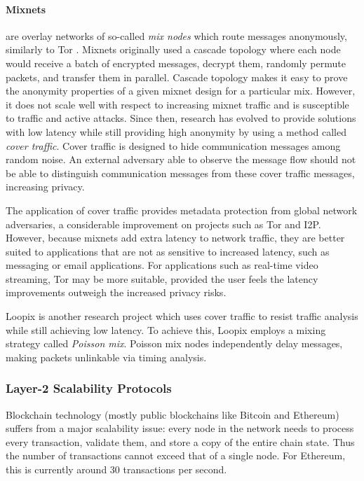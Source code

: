 \paragraph{Mixnets} are overlay networks of so-called \textit{mix nodes} which route messages anonymously, similarly to Tor \cite{mixnets}. Mixnets originally used a cascade topology where each node would receive a batch of encrypted messages, decrypt them, randomly permute packets, and transfer them in parallel. Cascade topology makes it easy to prove the anonymity properties of a given mixnet design for a particular mix. However, it does not scale well with respect to increasing mixnet traffic and is susceptible to traffic and active attacks. Since then, research has evolved to provide solutions with low latency while still providing high anonymity by using a method called \textit{cover traffic}. Cover traffic is designed to hide communication messages among random noise. An external adversary able to observe the message flow should not be able to
distinguish communication messages from these cover traffic messages, increasing privacy.

The application of cover traffic provides metadata protection from global network adversaries, a considerable improvement on projects such as Tor and I2P. However, because mixnets add extra latency to network traffic, they are better suited to applications that are not as sensitive to increased latency, such as messaging or email applications. For applications such as real-time video streaming, Tor may be more suitable, provided the user feels the latency improvements outweigh the increased privacy risks.

Loopix \cite{loopix} is another research project which uses cover traffic to resist traffic analysis while still achieving low latency. To achieve this, Loopix employs a mixing strategy called \textit{Poisson mix}. Poisson mix nodes independently delay messages, making packets unlinkable via timing analysis.

\subsubsection{Layer-2 Scalability Protocols}
\label{sec:l2protocols}

Blockchain technology (mostly public blockchains like Bitcoin and Ethereum) suffers from a major scalability issue: every node in the network needs to process every transaction, validate them, and store a copy of the entire chain state. Thus the number of transactions cannot exceed that of a single node. For Ethereum, this is currently around 30 transactions per second.


